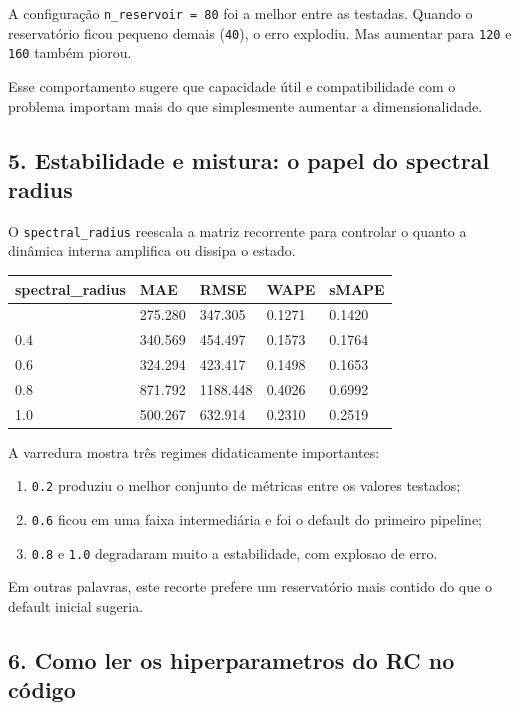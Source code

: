 \documentclass[12pt]{article}
\providecommand{\tightlist}{%
  \setlength{\itemsep}{0pt}\setlength{\parskip}{0pt}}
\begin{document}
A configuração \texttt{n\_reservoir\ =\ 80} foi a melhor entre as testadas. Quando o reservatório ficou pequeno demais (\texttt{40}), o erro explodiu. Mas aumentar para \texttt{120} e \texttt{160} também piorou.

Esse comportamento sugere que capacidade útil e compatibilidade com o problema importam mais do que simplesmente aumentar a dimensionalidade.

\subsection{5. Estabilidade e mistura: o papel do spectral radius}\label{5-estabilidade-e-mistura-o-papel-do-spectral-radius}

O \texttt{spectral\_radius} reescala a matriz recorrente para controlar o quanto a dinâmica interna amplifica ou dissipa o estado.

\begin{longtable}[]{@{}lllll@{}}
\toprule\noalign{}
spectral\_radius & MAE & RMSE & WAPE & sMAPE \\
\midrule\noalign{}
\endhead
\bottomrule\noalign{}
\endlastfoot
0.2 & 275.280 & 347.305 & 0.1271 & 0.1420 \\
0.4 & 340.569 & 454.497 & 0.1573 & 0.1764 \\
0.6 & 324.294 & 423.417 & 0.1498 & 0.1653 \\
0.8 & 871.792 & 1188.448 & 0.4026 & 0.6992 \\
1.0 & 500.267 & 632.914 & 0.2310 & 0.2519 \\
\end{longtable}

A varredura mostra três regimes didaticamente importantes:

\begin{enumerate}
\def\labelenumi{\arabic{enumi}.}
\tightlist
\item
  \texttt{0.2} produziu o melhor conjunto de métricas entre os valores testados;
\item
  \texttt{0.6} ficou em uma faixa intermediária e foi o default do primeiro pipeline;
\item
  \texttt{0.8} e \texttt{1.0} degradaram muito a estabilidade, com explosao de erro.
\end{enumerate}

Em outras palavras, este recorte prefere um reservatório mais contido do que o default inicial sugeria.

\subsection{6. Como ler os hiperparametros do RC no código}\label{6-como-ler-os-hiperparametros-do-rc-no-cuxf3digo}
\end{document}
